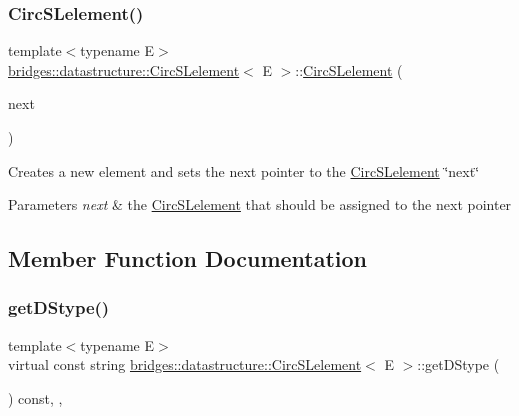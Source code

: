 \subsubsection{\texorpdfstring{Circ\+S\+Lelement()}{CircSLelement()}\hspace{0.1cm}{\footnotesize\ttfamily [4/4]}}
{\footnotesize\ttfamily template$<$typename E$>$ \\
\hyperlink{classbridges_1_1datastructure_1_1_circ_s_lelement}{bridges\+::datastructure\+::\+Circ\+S\+Lelement}$<$ E $>$\+::\hyperlink{classbridges_1_1datastructure_1_1_circ_s_lelement}{Circ\+S\+Lelement} (\begin{DoxyParamCaption}\item[{\hyperlink{classbridges_1_1datastructure_1_1_circ_s_lelement}{Circ\+S\+Lelement}$<$ E $>$ $\ast$}]{next }\end{DoxyParamCaption})\hspace{0.3cm}{\ttfamily [inline]}}

Creates a new element and sets the next pointer to the \hyperlink{classbridges_1_1datastructure_1_1_circ_s_lelement}{Circ\+S\+Lelement} \char`\"{}next\char`\"{} 
\begin{DoxyParams}{Parameters}
{\em next} & the \hyperlink{classbridges_1_1datastructure_1_1_circ_s_lelement}{Circ\+S\+Lelement} that should be assigned to the next pointer \\
\hline
\end{DoxyParams}


\subsection{Member Function Documentation}
\mbox{\label{classbridges_1_1datastructure_1_1_circ_s_lelement_a775ba08a7811fe91c396cb27ba9343ab}} 
\subsubsection{\texorpdfstring{get\+D\+Stype()}{getDStype()}}
{\footnotesize\ttfamily template$<$typename E$>$ \\
virtual const string \hyperlink{classbridges_1_1datastructure_1_1_circ_s_lelement}{bridges\+::datastructure\+::\+Circ\+S\+Lelement}$<$ E $>$\+::get\+D\+Stype (\begin{DoxyParamCaption}{ }\end{DoxyParamCaption}) const\hspace{0.3cm}{\ttfamily [inline]}, {\ttfamily [override]}, {\ttfamily [virtual]}}

